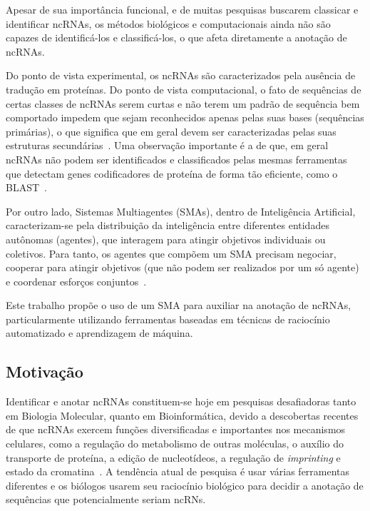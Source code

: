 Apesar de sua importância funcional, e de muitas pesquisas buscarem classicar e identificar ncRNAs, os métodos biológicos e computacionais ainda não são capazes de identificá-los e classificá-los, o que afeta diretamente a anotação de ncRNAs.

Do ponto de vista experimental, os ncRNAs são caracterizados pela ausência de tradução em prote\'inas. Do ponto de vista computacional, o fato de sequ\^encias de certas classes de ncRNAs serem curtas e não terem um padrão de sequência bem comportado impedem que sejam reconhecidos apenas pelas suas bases (sequ\^encias prim\'arias), o que significa que em geral devem ser caracterizadas pelas suas estruturas secundárias~\citep{huttenhofer2005non:2005}. Uma observação importante é a de que, em geral ncRNAs não podem ser identificados e classificados pelas mesmas ferramentas que detectam genes codificadores de proteína de forma tão eficiente, como o BLAST~\citep{rivas2001noncoding:2001}.


Por outro lado,  Sistemas Multiagentes (SMAs), dentro de Inteligência Artificial, caracterizam-se pela distribuição da inteligência entre diferentes entidades autônomas (agentes), que interagem para atingir objetivos individuais ou coletivos. Para tanto, os agentes que compõem um SMA precisam negociar, cooperar para atingir objetivos (que não podem ser realizados por um só agente) e coordenar esforços conjuntos~\citep{wooldridge2009introduction:2009}.

Este trabalho propõe o uso de um SMA para auxiliar na anotação de ncRNAs, particularmente utilizando ferramentas baseadas em técnicas de raciocínio automatizado e aprendizagem de máquina.


\subsection{Motivação}

Identificar e anotar ncRNAs constituem-se hoje em pesquisas desafiadoras tanto em Biologia Molecular, quanto em Bioinformática, devido a descobertas recentes de que ncRNAs exercem funções diversificadas e importantes nos mecanismos celulares, como a regulação do metabolismo de outras moléculas, o auxílio do transporte de proteína, a edição de nucleotídeos, a regulação de \textit{imprinting} e estado da cromatina~\citep{Sesam:2011}.
A tendência atual de pesquisa é usar várias ferramentas diferentes e os biólogos usarem seu raciocínio biológico para decidir a anotação de sequências que potencialmente seriam ncRNs.

